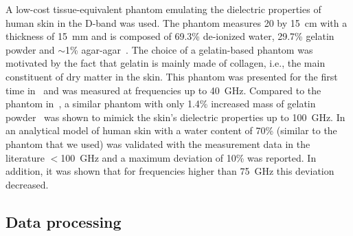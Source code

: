 \documentclass[preprint]{rsl}
\begin{document}
A low-cost tissue-equivalent phantom emulating the dielectric properties of human skin in the D-band was used. 
The phantom measures 20 by 15~cm with a thickness of 15~mm and is composed of 69.3\% de-ionized water, 29.7\% gelatin powder and $\sim$1\% agar-agar~\cite{aminzadeh2014_ELetters}. 
The choice of a gelatin-based phantom was motivated by the fact that gelatin is mainly made of collagen, i.e., the main constituent of dry matter in the skin. 
This phantom was presented for the first time in~\cite{aminzadeh2014_ELetters} and was measured at frequencies up to 40~GHz. 
Compared to the phantom in~\cite{aminzadeh2014_ELetters}, a similar phantom with only 1.4\% increased mass of gelatin powder~\cite{aminzadeh2017_awpl} was shown to mimick the skin's dielectric properties up to 100~GHz. 
In~\cite{aminzadeh2014_thesis} an analytical model of human skin with a water content of 70\% (similar to the phantom that we used) was validated with the measurement data in the literature $<$100~GHz and a maximum deviation of 10\% was reported. 
In addition, it was shown that for frequencies higher than 75~GHz this deviation decreased.

\subsection{Data processing}
\end{document}
